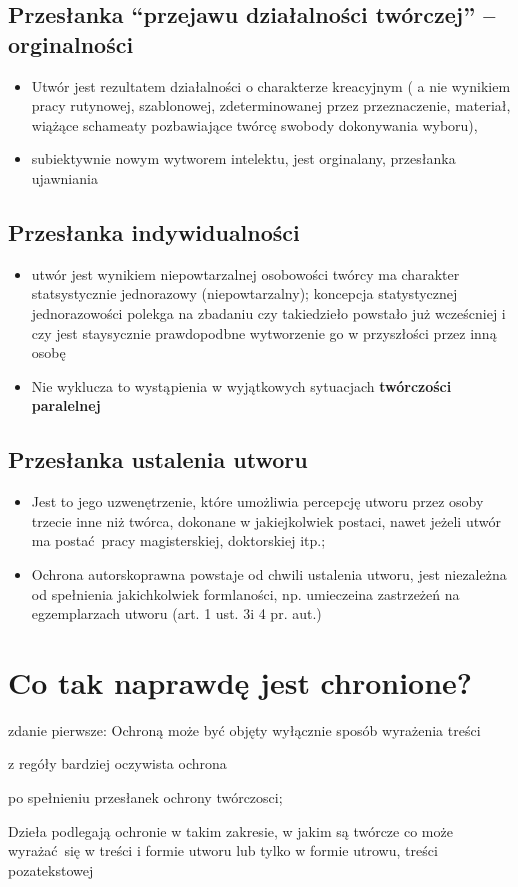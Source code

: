 \documentclass[11pt]{article}
\begin{document}
\subsection{Przesłanka ``przejawu działalności twórczej'' -- orginalności}
\label{sec:org2a4ab56}
\begin{itemize}
\item Utwór jest rezultatem działalności o charakterze kreacyjnym ( a nie wynikiem pracy rutynowej, szablonowej, zdeterminowanej przez przeznaczenie, materiał, wiążące schameaty pozbawiające twórcę swobody dokonywania wyboru),
\item subiektywnie nowym wytworem intelektu, jest orginalany, przesłanka ujawniania
\end{itemize}
\subsection{Przesłanka indywidualności}
\label{sec:orga17883a}
\begin{itemize}
\item utwór jest wynikiem niepowtarzalnej osobowości twórcy ma charakter statsystycznie jednorazowy (niepowtarzalny); koncepcja statystycznej jednorazowości polekga na zbadaniu czy takiedzieło powstało już wcześcniej i czy jest staysycznie prawdopodbne wytworzenie go w przyszłości przez inną osobę
\item Nie wyklucza to wystąpienia w wyjątkowych sytuacjach \textbf{twórczości paralelnej}
\end{itemize}
\subsection{Przesłanka ustalenia utworu}
\label{sec:org64fea9f}
\begin{itemize}
\item Jest to jego uzwenętrzenie, które umożliwia percepcję utworu przez osoby trzecie inne niż twórca, dokonane w jakiejkolwiek postaci, nawet jeżeli utwór ma postać pracy magisterskiej, doktorskiej itp.;
\item Ochrona autorskoprawna powstaje od chwili ustalenia utworu, jest niezależna od spełnienia jakichkolwiek formlaności, np. umieczeina zastrzeżeń na egzemplarzach utworu (art. 1 ust. 3i 4 pr. aut.)
\end{itemize}
\section{Co tak naprawdę jest chronione?}
\label{sec:orge187439}
\begin{description}
\item[{Art. 1 ust. 2'}] zdanie pierwsze: Ochroną może być objęty wyłącznie sposób wyrażenia treści
\item[{Forma --}] z regóły bardziej oczywista ochrona
\item[{Treść --}] po spełnieniu przesłanek ochrony twórczosci;
\item Dzieła podlegają ochronie w takim zakresie, w jakim są twórcze co może wyrażać się w treści i formie utworu lub tylko w formie utrowu, treści pozatekstowej
\end{description}
\end{document}
